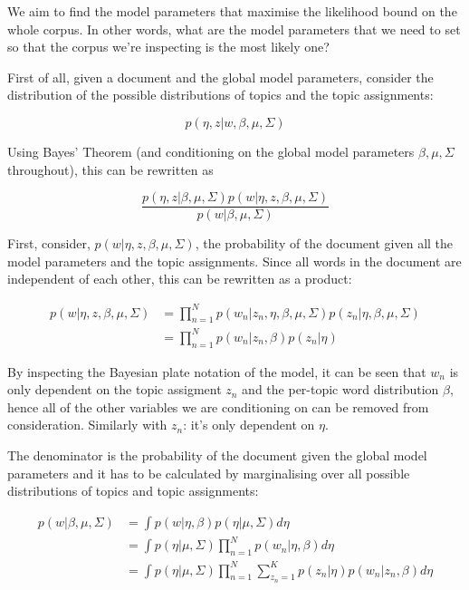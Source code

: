 \documentclass[12pt,a4paper,twoside,openright]{report}
\begin{document}
We aim to find the model parameters that maximise the likelihood bound on the whole corpus. In other words, what are the model parameters that we need to set so that the corpus we're inspecting is the most likely one?

First of all, given a document and the global model parameters, consider the distribution of the possible distributions of topics and the topic assignments:

\begin{equation}
p(\eta, z | w, \beta, \mu, \Sigma)
\end{equation}

Using Bayes' Theorem (and conditioning on the global model parameters $\beta, \mu, \Sigma$ throughout), this can be rewritten as 

\begin{equation}
\frac{p(\eta, z | \beta, \mu, \Sigma) p(w | \eta, z, \beta, \mu, \Sigma)}{p(w | \beta, \mu, \Sigma)}
\end{equation}

First, consider, $p(w | \eta, z, \beta, \mu, \Sigma)$, the probability of the document given all the model parameters and the topic assignments. Since all words in the document are independent of each other, this can be rewritten as a product:

\begin{align}
p(w | \eta, z, \beta, \mu, \Sigma) &= \prod\limits_{n=1}^N p(w_n | z_n, \eta, \beta, \mu, \Sigma) p(z_n | \eta, \beta, \mu, \Sigma)\\
& = \prod\limits_{n=1}^N p(w_n | z_n, \beta) p(z_n | \eta)
\end{align}

By inspecting the Bayesian plate notation of the model, it can be seen that $w_n$ is only dependent on the topic assigment $z_n$ and the per-topic word distribution $\beta$, hence all of the other variables we are conditioning on can be removed from consideration. Similarly with $z_n$: it's only dependent on $\eta$.

The denominator is the probability of the document given the global model parameters and it has to be calculated by marginalising over all possible distributions of topics and topic assignments:

\begin{align}
p(w | \beta, \mu, \Sigma) & = \int p(w | \eta, \beta) p(\eta | \mu, \Sigma) d\eta \\
& =\int p(\eta | \mu, \Sigma)  \prod\limits_{n=1}^N p(w_n | \eta, \beta) d\eta \\
& =\int p(\eta | \mu, \Sigma)  \prod\limits_{n=1}^N \sum\limits_{z_n=1}^K p(z_n | \eta) p(w_n | z_n, \beta) d\eta
\end{align}
\end{document}
